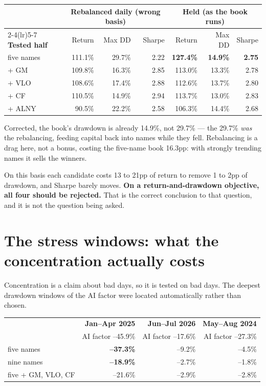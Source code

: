 \documentclass[11pt]{article}
\begin{document}
\begin{center}
\footnotesize
\begin{tabular}{@{}l r r r r r r@{}}
\toprule
& \multicolumn{3}{c}{\textbf{Rebalanced daily} (wrong basis)}
& \multicolumn{3}{c}{\textbf{Held} (as the book runs)} \\
\cmidrule(lr){2-4}\cmidrule(lr){5-7}
\textbf{Tested half} & Return & Max DD & Sharpe & Return & Max DD & Sharpe \\
\midrule
five names & 111.1\% & 29.7\% & 2.22 & \textbf{127.4\%} & \textbf{14.9\%} & \textbf{2.75} \\
+ GM       & 109.8\% & 16.3\% & 2.85 & 113.0\% & 13.3\% & 2.78 \\
+ VLO      & 108.6\% & 17.4\% & 2.88 & 112.6\% & 13.7\% & 2.80 \\
+ CF       & 110.5\% & 14.9\% & 2.94 & 113.7\% & 13.0\% & 2.83 \\
+ ALNY     &  90.5\% & 22.2\% & 2.58 & 106.3\% & 14.4\% & 2.68 \\
\bottomrule
\end{tabular}
\end{center}

Corrected, the book's drawdown is already 14.9\%, not 29.7\% --- the 29.7\% \emph{was} the
rebalancing, feeding capital back into names while they fell. Rebalancing is a drag here, not a
bonus, costing the five-name book 16.3pp: with strongly trending names it sells the winners.

On this basis each candidate costs 13 to 21pp of return to remove 1 to 2pp of drawdown, and
Sharpe barely moves. \textbf{On a return-and-drawdown objective, all four should be rejected.}
That is the correct conclusion to that question, and it is not the question being asked.

\section{The stress windows: what the concentration actually costs}

Concentration is a claim about bad days, so it is tested on bad days. The deepest drawdown
windows of the AI factor were located automatically rather than chosen.

\begin{center}
\footnotesize
\begin{tabular}{@{}l r r r@{}}
\toprule
& \textbf{Jan--Apr 2025} & \textbf{Jun--Jul 2026} & \textbf{May--Aug 2024} \\
& \tiny AI factor --45.9\% & \tiny AI factor --17.6\% & \tiny AI factor --27.3\% \\
\midrule
five names           & \textbf{--37.3\%} & --9.2\% & --4.5\% \\
nine names           & \textbf{--18.9\%} & --2.7\% & --1.8\% \\
five + GM, VLO, CF   & --21.6\%          & --2.9\% & --2.8\% \\
\bottomrule
\end{tabular}
\end{center}
\end{document}
